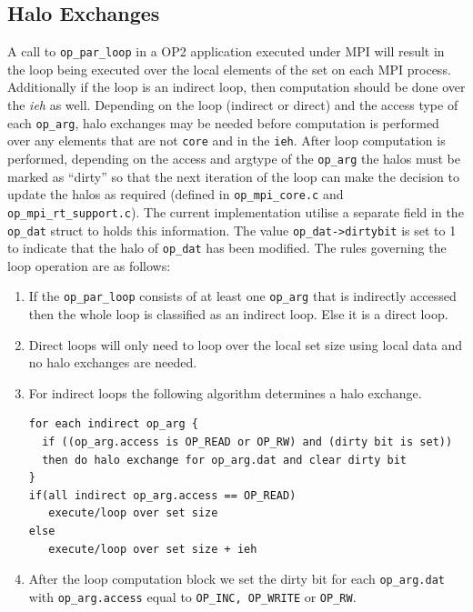 \documentclass[11pt]{article}
\begin{document}
\subsection{Halo Exchanges}\label{subsec/exchange}
A call to \texttt{op\_par\_loop} in a OP2 application executed under MPI will result in the loop being executed over the
local elements of the set on each MPI process. Additionally if the loop is an indirect loop, then computation
should be done over the \textit{ieh} as well. Depending on the loop (indirect or direct) and the access type of each
\texttt{op\_arg}, halo exchanges may be needed before computation is performed over any elements that are not
\texttt{core} and in the \texttt{ieh}. After loop computation is performed, depending on the access and argtype of the
\texttt{op\_arg} the halos must be marked as ``dirty'' so that the next iteration of the loop can make the decision to
update the halos as required (defined in \texttt{op\_mpi\_core.c} and \texttt{op\_mpi\_rt\_support.c}). The current
implementation utilise a separate field in the \texttt{op\_dat} struct to holds this information. The value
\texttt{op\_dat->dirtybit} is set to 1 to indicate that the halo of \texttt{op\_dat} has been modified. The rules
governing the loop operation are as follows:
\begin{enumerate}
\item If the \texttt{op\_par\_loop} consists of at least one \texttt{op\_arg}
that is indirectly accessed then the whole loop is classified as an indirect
loop. Else it is a direct loop.

\item Direct loops will only need to loop over the local set size using local
data and no halo exchanges are needed.

\item For indirect loops the following algorithm determines a halo exchange.
\begin{verbatim}
for each indirect op_arg {
  if ((op_arg.access is OP_READ or OP_RW) and (dirty bit is set))
  then do halo exchange for op_arg.dat and clear dirty bit
}
if(all indirect op_arg.access == OP_READ)
   execute/loop over set size
else
   execute/loop over set size + ieh
\end{verbatim}
\item After the loop computation block we set the dirty bit for each
\texttt{op\_arg.dat} with \texttt{op\_arg.access} equal to \texttt{OP\_INC,
OP\_WRITE} or \texttt{OP\_RW}.
\end{enumerate}
\end{document}
